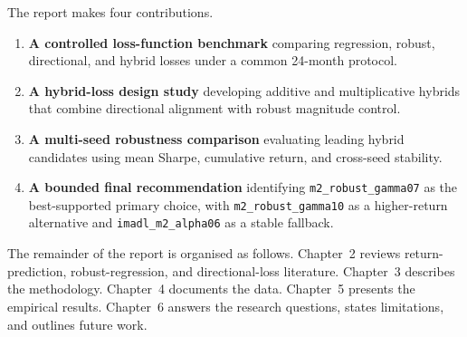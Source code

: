 \label{ch1:contributions}

The report makes four contributions.

\begin{enumerate}
 \item \textbf{A controlled loss-function benchmark} comparing regression, robust, directional, and hybrid losses under a common 24-month protocol.
 \item \textbf{A hybrid-loss design study} developing additive and multiplicative hybrids that combine directional alignment with robust magnitude control.
 \item \textbf{A multi-seed robustness comparison} evaluating leading hybrid candidates using mean Sharpe, cumulative return, and cross-seed stability.
 \item \textbf{A bounded final recommendation} identifying \texttt{m2\_robust\_gamma07} as the best-supported primary choice, with \texttt{m2\_robust\_gamma10} as a higher-return alternative and \texttt{imadl\_m2\_alpha06} as a stable fallback.
\end{enumerate}

The remainder of the report is organised as follows. Chapter~2 reviews return-prediction, robust-regression, and directional-loss literature. Chapter~3 describes the methodology. Chapter~4 documents the data. Chapter~5 presents the empirical results. Chapter~6 answers the research questions, states limitations, and outlines future work.
